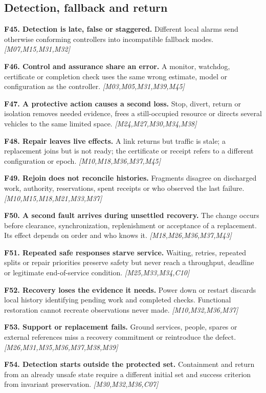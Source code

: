 \documentclass[11pt]{article}
\newcommand{\f}[4]{\par\smallskip\noindent\textbf{#1. #2.} #3 \textit{[#4]}\par}
\begin{document}
\subsection{Detection, fallback and return}
\f{F45}{Detection is late, false or staggered}{Different local alarms send otherwise conforming controllers into incompatible fallback modes.}{M07,M15,M31,M32}
\f{F46}{Control and assurance share an error}{A monitor, watchdog, certificate or completion check uses the same wrong estimate, model or configuration as the controller.}{M03,M05,M31,M39,M45}
\f{F47}{A protective action causes a second loss}{Stop, divert, return or isolation removes needed evidence, frees a still-occupied resource or directs several vehicles to the same limited space.}{M24,M27,M30,M34,M38}
\f{F48}{Repair leaves live effects}{A link returns but traffic is stale; a replacement joins but is not ready; the certificate or receipt refers to a different configuration or epoch.}{M10,M18,M36,M37,M45}
\f{F49}{Rejoin does not reconcile histories}{Fragments disagree on discharged work, authority, reservations, spent receipts or who observed the last failure.}{M10,M15,M18,M21,M33,M37}
\f{F50}{A second fault arrives during unsettled recovery}{The change occurs before clearance, synchronization, replenishment or acceptance of a replacement. Its effect depends on order and who knows it.}{M18,M26,M36,M37,M43}
\f{F51}{Repeated safe responses starve service}{Waiting, retries, repeated splits or repair priorities preserve safety but never reach a throughput, deadline or legitimate end-of-service condition.}{M25,M33,M34,C10}
\f{F52}{Recovery loses the evidence it needs}{Power down or restart discards local history identifying pending work and completed checks. Functional restoration cannot recreate observations never made.}{M10,M32,M36,M37}
\f{F53}{Support or replacement fails}{Ground services, people, spares or external references miss a recovery commitment or reintroduce the defect.}{M26,M31,M35,M36,M37,M38,M39}
\f{F54}{Detection starts outside the protected set}{Containment and return from an already unsafe state require a different initial set and success criterion from invariant preservation.}{M30,M32,M36,C07}
\end{document}
